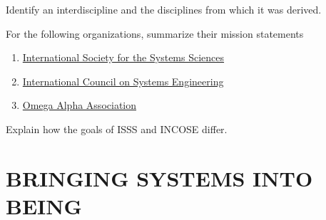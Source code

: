 \begin{exercises}
    \begin{exercise} 
    \label{sea-1-33}
        Identify an interdiscipline and the disciplines from which it was derived.
    \end{exercise}
    \begin{solution}
    \end{solution}
    
    \begin{exercise} 
    \label{sea-1-35_36_38}
        For the following organizations, summarize their mission statements
        \begin{enumerate}[label=\alph*)]
            \item \href{http://isss.org/world/index.php}{International Society for the Systems Sciences}
            \item \href{https://www.incose.org/}{International Council on Systems Engineering}
            \item \href{https://omegalpha.org/}{Omega Alpha Association}
        \end{enumerate}
    \end{exercise}
    \begin{solution}
    \end{solution}
    
    \begin{exercise} 
    \label{sea-1-37}
        Explain how the goals of ISSS and INCOSE differ.
    \end{exercise}
    \begin{solution}
    \end{solution}

\end{exercises}


\chapter{BRINGING SYSTEMS INTO BEING}

